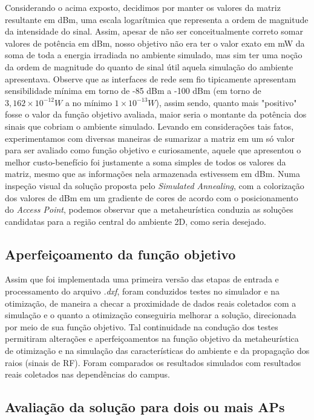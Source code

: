 \documentclass[
	12pt,				%
	openright,			%
	twoside,			%
	a4paper,			%
	english,			%
	french,				%
	spanish,			%
	brazil				%
	]{abntex2}
\begin{document}
Considerando o acima exposto, decidimos por manter os valores da matriz resultante em dBm, uma escala logarítmica que representa a ordem de magnitude da intensidade do sinal. Assim, apesar de não ser conceitualmente correto somar valores de potência em dBm, nosso objetivo não era ter o valor exato em mW da soma de toda a energia irradiada no ambiente simulado, mas sim ter uma noção da ordem de magnitude do quanto de sinal útil aquela simulação do ambiente apresentava. Observe que as interfaces de rede sem fio tipicamente apresentam sensibilidade mínima em torno de -85 dBm a -100 dBm (em torno de $ 3,162\times10^{-12} W $ a no mínimo $ 1\times10^{-13} W $), assim sendo, quanto mais "positivo" fosse o valor da função objetivo avaliada, maior seria o montante da potência dos sinais que cobriam o ambiente simulado. Levando em considerações tais fatos, experimentamos com diversas maneiras de sumarizar a matriz em um só valor para ser avaliado como função objetivo e curiosamente, aquele que apresentou o melhor custo-benefício foi justamente a soma simples de todos os valores da matriz, mesmo que as informações nela armazenada estivessem em dBm. Numa inspeção visual da solução proposta pelo \textit{Simulated Annealing}, com a colorização dos valores de dBm em um gradiente de cores de acordo com o posicionamento do \textit{Access Point}, podemos observar que a metaheurística conduzia as soluções candidatas para a região central do ambiente 2D, como seria desejado.


\subsection[Aperfeiçoamento da função objetivo ]{Aperfeiçoamento da função objetivo }

Assim que foi implementada uma primeira versão das etapas de entrada e processamento do arquivo \textit{.dxf}, foram conduzidos testes no simulador e na otimização, de maneira a checar a proximidade de dados reais coletados com a simulação e o quanto a otimização conseguiria melhorar a solução, direcionada por meio de sua função objetivo. Tal continuidade na condução dos testes permitiram alterações e aperfeiçoamentos na função objetivo da metaheurística de otimização e na simulação das características do ambiente e da propagação dos raios (sinais de RF). Foram comparados os resultados simulados com resultados reais coletados nas dependências do campus. 

\subsection[Avaliação da solução para dois ou mais APs]{Avaliação da solução para dois ou mais APs}
\end{document}

